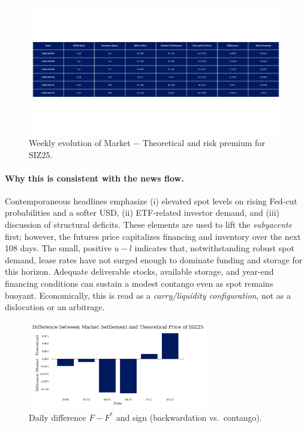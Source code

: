 \documentclass[10pt,a4paper]{article} %
\begin{document}
\begin{figure}[h]
\centering
\includegraphics[width=\textwidth]{figures/silver_pricing_over_the_week.pdf}
\caption{Weekly evolution of Market \(-\) Theoretical and risk premium for SIZ25.}
\label{fig:silver_week}
\end{figure}


\paragraph{Why this is consistent with the news flow.}
Contemporaneous headlines emphasize (i) elevated spot levels on rising Fed-cut probabilities and a softer USD, (ii) ETF-related investor demand, and (iii) discussion of structural deficits. These elements are used to lift the \emph{subyacente} first; however, the futures price capitalizes financing and inventory over the next 108 days. The small, positive \(u-l\) indicates that, notwithstanding robust spot demand, lease rates have not surged enough to dominate funding and storage for this horizon. Adequate deliverable stocks, available storage, and year-end financing conditions can sustain a modest contango even as spot remains buoyant. Economically, this is read as a \emph{carry/liquidity configuration}, not as a dislocation or an arbitrage.


\begin{figure}[h]
\centering
\includegraphics[width=0.7\textwidth]{figures/silver_difference.pdf}
\caption{Daily difference \(F-F^{*}\) and sign (backwardation vs.\ contango).}
\label{fig:silver_difference}
\end{figure}
\end{document}
